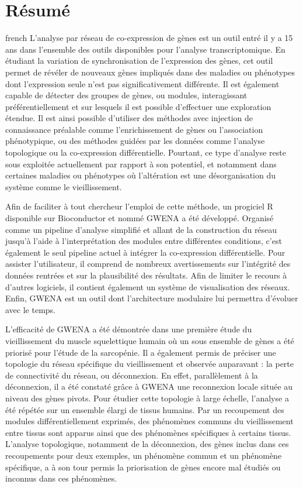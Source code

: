 \chapter*{Résumé}                      %

\begin{otherlanguage*}{french}
L'analyse par réseau de co-expression de gènes est un outil entré il y a 15 ans dans l'ensemble des outils disponibles pour l'analyse transcriptomique. En étudiant la variation de synchronisation de l'expression des gènes, cet outil permet de révéler de nouveaux gènes impliqués dans des maladies ou phénotypes dont l'expression seule n'est pas significativement différente. Il est également capable de détecter des groupes de gènes, ou modules, interagissant préférentiellement et sur lesquels il est possible d'effectuer une exploration étendue. Il est ainsi possible d'utiliser des méthodes avec injection de connaissance préalable comme l'enrichissement de gènes ou l'association phénotypique, ou des méthodes guidées par les données comme l'analyse topologique ou la co-expression différentielle. Pourtant, ce type d'analyse reste sous exploitée actuellement par rapport à son potentiel, et notamment dans certaines maladies ou phénotypes où l'altération est une désorganisation du système comme le vieillissement. 

Afin de faciliter à tout chercheur l'emploi de cette méthode, un progiciel R disponible sur Bioconductor et nommé GWENA a été développé. Organisé comme un pipeline d'analyse simplifié et allant de la construction du réseau jusqu'à l'aide à l'interprétation des modules entre différentes conditions, c'est également le seul pipeline actuel à intégrer la co-expression différentielle. Pour assister l'utilisateur, il comprend de nombreux avertissements sur l'intégrité des données rentrées et sur la plausibilité des résultats. Afin de limiter le recours à d'autres logiciels, il contient également un système de visualisation des réseaux. Enfin, GWENA est un outil dont l'architecture modulaire lui permettra d'évoluer avec le temps.

L'efficacité de GWENA a été démontrée dans une première étude du vieillissement du muscle squelettique humain où un sous ensemble de gènes a été priorisé pour l'étude de la sarcopénie. Il a également permis de préciser une topologie du réseau spécifique du vieillissement et observée auparavant : la perte de connectivité du réseau, ou déconnexion. En effet, parallèlement à la déconnexion, il a été constaté grâce à GWENA une reconnexion locale située au niveau des gènes pivots. Pour étudier cette topologie à large échelle, l'analyse a été répétée sur un ensemble élargi de tissus humains. Par un recoupement des modules différentiellement exprimés, des phénomènes communs du vieillissement entre tissus sont apparus ainsi que des phénomènes spécifiques à certains tissus. L'analyse topologique, notamment de la déconnexion, des gènes inclus dans ces recoupements pour deux exemples, un phénomène commun et un phénomène spécifique, a à son tour permis la priorisation de gènes encore mal étudiés ou inconnus dans ces phénomènes.


\end{otherlanguage*}
